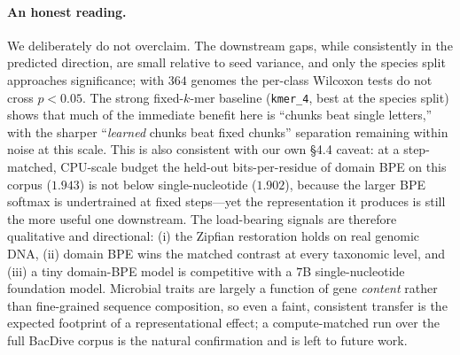 \paragraph{An honest reading.} We deliberately do not overclaim. The downstream
gaps, while consistently in the predicted direction, are small relative to
seed variance, and only the species split approaches significance; with $364$
genomes the per-class Wilcoxon tests do not cross $p<0.05$. The strong
fixed-$k$-mer baseline (\texttt{kmer\_4}, best at the species split) shows that
much of the immediate benefit here is ``chunks beat single letters,'' with the
sharper ``\emph{learned} chunks beat fixed chunks'' separation remaining within
noise at this scale. This is also consistent with our own \S4.4 caveat: at a
step-matched, CPU-scale budget the held-out bits-per-residue of domain BPE on
this corpus ($1.943$) is not below single-nucleotide ($1.902$), because the
larger BPE softmax is undertrained at fixed steps---yet the representation it
produces is still the more useful one downstream. The load-bearing signals are
therefore qualitative and directional: (i) the Zipfian restoration holds on
real genomic DNA, (ii) domain BPE wins the matched contrast at every taxonomic
level, and (iii) a tiny domain-BPE model is competitive with a $7$B
single-nucleotide foundation model. Microbial traits are largely a function of
gene \emph{content} rather than fine-grained sequence composition, so even a
faint, consistent transfer is the expected footprint of a representational
effect; a compute-matched run over the full BacDive corpus is the natural
confirmation and is left to future work.

%

%

